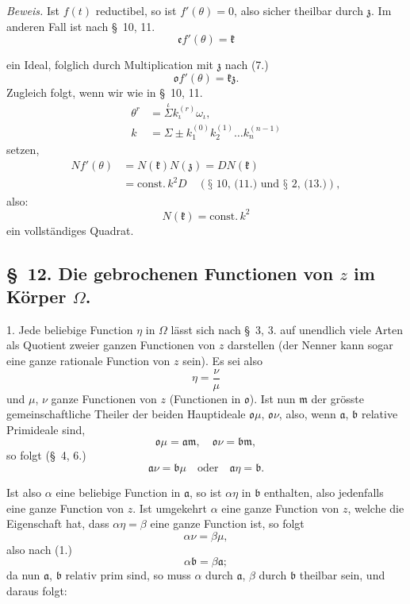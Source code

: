 \documentclass{article}
\begin{document}
\emph{Beweis.} Ist $f(t)$ reductibel, so ist $f'(\theta) = 0$, also sicher theilbar durch $\mathfrak{z}$. Im anderen Fall ist nach §~10, 11.
\[ \mathfrak{e}f'(\theta) = \mathfrak{k} \]

ein Ideal, folglich durch Multiplication mit $\mathfrak{z}$ nach (7.)
\[ \mathfrak{o}f'(\theta) = \mathfrak{k}\mathfrak{z}. \tag{10.} \]
Zugleich folgt, wenn wir wie in §~10, 11.
\[ \begin{aligned} \theta^{r} &= \overset{\iota}{\Sigma} k_{\iota}^{(r)}\omega_{\iota}, \\ k &= \Sigma \pm k_{1}^{(0)}k_{2}^{(1)}\ldots k_{n}^{(n-1)} \end{aligned} \]
setzen,
\[ \begin{aligned} Nf'(\theta) &= N(\mathfrak{k})N(\mathfrak{z}) = DN(\mathfrak{k}) \\ &= \text{const.}\,k^{2}D \quad (\text{§~10, (11.) und §~2, (13.)}), \end{aligned} \]
also:
\[ N(\mathfrak{k}) = \text{const.}\,k^{2} \tag{11.} \]
ein vollständiges Quadrat.

\subsection*{§~12. Die gebrochenen Functionen von $z$ im Körper $\Omega$.}

1. Jede beliebige Function $\eta$ in $\Omega$ lässt sich nach §~3, 3. auf unendlich viele Arten als Quotient zweier ganzen Functionen von $z$ darstellen (der Nenner kann sogar eine ganze rationale Function von $z$ sein). Es sei also
\[ \eta = \frac{\nu}{\mu} \]
und $\mu$, $\nu$ ganze Functionen von $z$ (Functionen in $\mathfrak{o}$). Ist nun $\mathfrak{m}$ der grösste gemeinschaftliche Theiler der beiden Hauptideale $\mathfrak{o}\mu$, $\mathfrak{o}\nu$, also, wenn $\mathfrak{a}$, $\mathfrak{b}$ relative Primideale sind,
\[ \mathfrak{o}\mu = \mathfrak{a}\mathfrak{m}, \quad \mathfrak{o}\nu = \mathfrak{b}\mathfrak{m}, \tag{1.} \]
so folgt (§~4, 6.)
\[ \mathfrak{a}\nu = \mathfrak{b}\mu \quad \text{oder} \quad \mathfrak{a}\eta = \mathfrak{b}. \tag{2.} \]

Ist also $\alpha$ eine beliebige Function in $\mathfrak{a}$, so ist $\alpha\eta$ in $\mathfrak{b}$ enthalten, also jedenfalls eine ganze Function von $z$. Ist umgekehrt $\alpha$ eine ganze Function von $z$, welche die Eigenschaft hat, dass $\alpha\eta = \beta$ eine ganze Function ist, so folgt
\[ \alpha\nu = \beta\mu, \]
also nach (1.)
\[ \alpha\mathfrak{b} = \beta\mathfrak{a}; \]
da nun $\mathfrak{a}$, $\mathfrak{b}$ relativ prim sind, so muss $\alpha$ durch $\mathfrak{a}$, $\beta$ durch $\mathfrak{b}$ theilbar sein, und daraus folgt:
\end{document}
